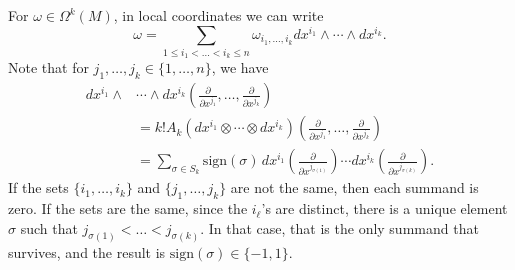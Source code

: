 \documentclass{ximera}
\begin{document}
    For $\omega \in \Omega ^k (M)$, in local coordinates we can write
    \[     \omega = \sum _{1 \leq i_1 < \ldots < i_k \leq n } \omega_{i _1, \ldots , i_k} dx^{i_1} \wedge \cdots \wedge dx ^{i_k}     .   \]
    Note that for $j_1, \ldots , j_k \in \{ 1, \ldots , n \}$, we have
    \begin{align*}
           dx^{i_1} \wedge & \cdots   \wedge dx^{i_k} (\tfrac{\partial}{\partial x ^{j_1}}, \ldots , \tfrac{\partial }{\partial x ^{j_k}})           \\
           & =  k! A_k (dx^{i_1} \otimes \cdots   \otimes dx^{i_k} )  (\tfrac{\partial}{\partial x ^{j_1}}, \ldots , \tfrac{\partial }{\partial x ^{j_k}})  \\
           & = \sum_{\sigma \in S_k} \text{sign}(\sigma) \, dx^{i_1} \left( \tfrac{\partial }{\partial x ^{j _{\sigma (1)}}} \right) \cdots  dx^{i_k} \left( \tfrac{\partial }{\partial x ^{j _{\sigma (k)}}} \right) . 
    \end{align*}
    If the sets $\{ i_1 , \ldots , i_k \}$ and $\{ j_1, \ldots , j_k \}$ are not the same, then each summand is zero. If the sets are the same, since the $i_{\ell}$'s are distinct, there is a unique element  $\sigma$ such that $j_{\sigma (1)} < \ldots < j_{\sigma (k)}$. In that case, that is the only summand that survives, and the result is $\text{sign}(\sigma) \in \{ -1, 1 \} $. 
\end{document}
